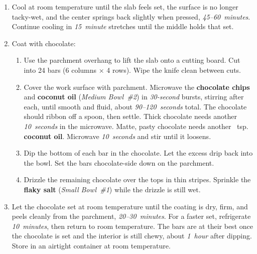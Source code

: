 \documentclass[11pt,letterpaper]{article}
\begin{document}
\begin{enumerate}
    \item Cool at room temperature until the slab feels set, the surface is no longer tacky-wet, and the center springs back slightly when pressed, \textit{45--60~minutes}. Continue cooling in \textit{15~minute} stretches until the middle holds that set.

    \item Coat with chocolate:
    \begin{enumerate}
        \item Use the parchment overhang to lift the slab onto a cutting board. Cut into 24 bars (6 columns × 4 rows). Wipe the knife clean between cuts.
        \item Cover the work surface with parchment. Microwave the \textbf{chocolate chips} and \textbf{coconut oil} (\textit{Medium Bowl~\#2}) in \textit{30-second} bursts, stirring after each, until smooth and fluid, about \textit{90--120~seconds} total. The chocolate should ribbon off a spoon, then settle. Thick chocolate needs another \textit{10~seconds} in the microwave. Matte, pasty chocolate needs another ~tsp. \textbf{coconut oil}. Microwave \textit{10~seconds} and stir until it loosens.
        \item Dip the bottom of each bar in the chocolate. Let the excess drip back into the bowl. Set the bars chocolate-side down on the parchment.
        \item Drizzle the remaining chocolate over the tops in thin stripes. Sprinkle the \textbf{flaky salt} (\textit{Small Bowl~\#1}) while the drizzle is still wet.
    \end{enumerate}

    \item Let the chocolate set at room temperature until the coating is dry, firm, and peels cleanly from the parchment, \textit{20--30~minutes}. For a faster set, refrigerate \textit{10~minutes}, then return to room temperature. The bars are at their best once the chocolate is set and the interior is still chewy, about \textit{1~hour} after dipping. Store in an airtight container at room temperature.
\end{enumerate}

\newpage
\end{document}
